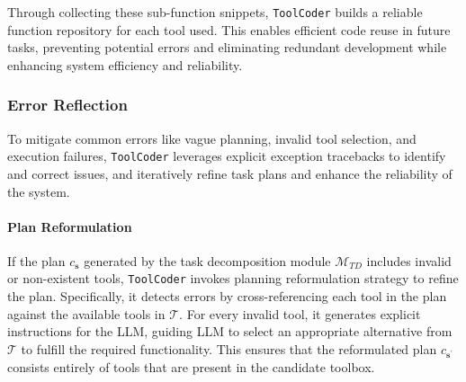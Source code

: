 Through collecting these sub-function snippets, \texttt{ToolCoder} builds a reliable function repository for each tool used. 
This enables efficient code reuse in future tasks, preventing potential errors and eliminating redundant development while enhancing system efficiency and reliability.



\subsubsection{Error Reflection}
\label{sec:reflection}
To mitigate common errors like vague planning, invalid tool selection, and execution failures, \texttt{ToolCoder} leverages explicit exception tracebacks to identify and correct issues, and iteratively refine task plans and enhance the reliability of the system.

\paragraph{Plan Reformulation}  
If the plan $c_{\boldsymbol{s}}$ generated by the task decomposition module $\mathcal{M}_{TD}$ includes invalid or non-existent tools, \texttt{ToolCoder} invokes planning reformulation strategy to refine the plan. Specifically, it detects errors by cross-referencing each tool in the plan against the available tools in $\mathcal{T}$. For every invalid tool, it generates explicit instructions for the LLM, guiding LLM to select an appropriate alternative from $\mathcal{T}$ to fulfill the required functionality. This ensures that the reformulated plan $c_{\boldsymbol{s}^{'}}$ consists entirely of tools that are present in the candidate toolbox.

